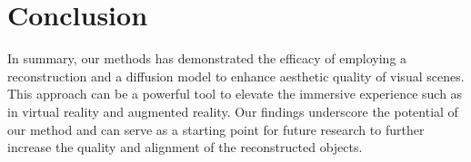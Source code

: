 \section{Conclusion}
\label{sec:conclusion}

In summary, our methods has demonstrated the efficacy of employing a reconstruction and a diffusion model to enhance aesthetic quality of visual scenes. This approach can be a powerful tool to elevate the immersive experience such as in virtual reality and augmented reality. Our findings underscore the potential of our method and can serve as a starting point for future research to further increase the quality and alignment of the reconstructed objects.